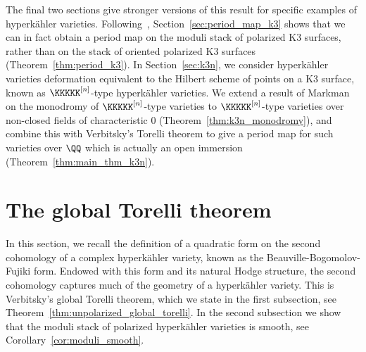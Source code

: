 The final two sections give stronger versions of this result for specific examples of hyperk\"ahler varieties. Following~\cite{TaelmanShimuraStacks}, Section~\ref{sec:period_map_k3} shows that we can in fact obtain a period map on the moduli stack of polarized K3 surfaces, rather than on the stack of oriented polarized K3 surfaces (Theorem~\ref{thm:period_k3}). In Section~\ref{sec:k3n}, we consider hyperk\"ahler varieties deformation equivalent to the Hilbert scheme of points on a K3 surface, known as $\KKKKK^{[n]}$-type hyperk\"ahler varieties. We extend a result of Markman on the monodromy of $\KKKKK^{[n]}$-type varieties to $\KKKKK^{[n]}$-type varieties over non-closed fields of characteristic $0$ (Theorem~\ref{thm:k3n_monodromy}), and combine this with Verbitsky's Torelli theorem to give a period map for such varieties over $\QQ$ which is actually an open immersion (Theorem~\ref{thm:main_thm_k3n}).






\section{The global Torelli theorem}
In this section, we recall the definition of a quadratic form on the second cohomology of a complex hyperk\"ahler variety, known as the Beauville-Bogomolov-Fujiki form. Endowed with this form and its natural Hodge structure, the second cohomology captures much of the geometry of a hyperk\"ahler variety. This is Verbitsky's global Torelli theorem, which we state in the first subsection, see Theorem~\ref{thm:unpolarized_global_torelli}. In the second subsection we show that the moduli stack of polarized hyperk\"ahler varieties is smooth, see Corollary~\ref{cor:moduli_smooth}.

